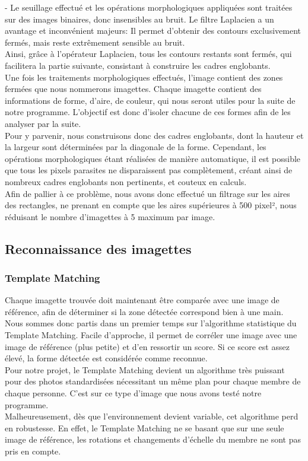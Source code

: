 \documentclass[10pt,a4paper]{report}
\begin{document}
	- Le seuillage effectué et les opérations morphologiques appliquées sont traitées sur des images binaires, donc insensibles au bruit. Le filtre Laplacien a un avantage et inconvénient majeurs: Il permet d'obtenir des contours exclusivement fermés, mais reste extrêmement sensible au bruit.\\
	\newline
Ainsi, grâce à l'opérateur Laplacien, tous les contours restants sont fermés, qui facilitera la partie suivante, consistant à construire les cadres englobants.\\
\newline
Une fois les traitements morphologiques effectués, l'image contient des zones fermées que nous nommerons imagettes. Chaque imagette contient des informations de forme, d'aire, de couleur, qui nous seront utiles pour la suite de notre programme. L'objectif est donc d'isoler chacune de ces formes afin de les analyser par la suite.\\
Pour y parvenir, nous construisons donc des cadres englobants, dont la hauteur et la largeur sont déterminées par la diagonale de la forme. Cependant, les opérations morphologiques étant réalisées de manière automatique, il est possible que tous les pixels parasites ne disparaissent pas complètement, créant ainsi de nombreux cadres englobants non pertinents, et couteux en calculs.\\
Afin de pallier à ce problème, nous avons donc effectué un filtrage sur les aires des rectangles, ne prenant en compte que les aires supérieures à 500 pixel², nous réduisant le nombre d'imagettes à 5 maximum par image.
\subsection{Reconnaissance des imagettes}
\subsubsection*{Template Matching}
Chaque imagette trouvée doit maintenant être comparée avec une image de référence, afin de déterminer si la zone détectée correspond bien à une main. Nous sommes donc partis dans un premier temps sur l'algorithme statistique du Template Matching. Facile d'approche, il permet de corréler une image avec une image de référence (plus petite) et d'en ressortir un score. Si ce score est assez élevé, la forme détectée est considérée comme reconnue.\\
Pour notre projet, le Template Matching devient un algorithme très puissant pour des photos standardisées nécessitant un même plan pour chaque membre de chaque personne. C'est sur ce type d'image que nous avons testé notre programme.\\
Malheureusement, dès que l'environnement devient variable, cet algorithme perd en robustesse. En effet, le Template Matching ne se basant que sur une seule image de référence, les rotations et changements d'échelle du membre ne sont pas pris en compte.
\end{document}
